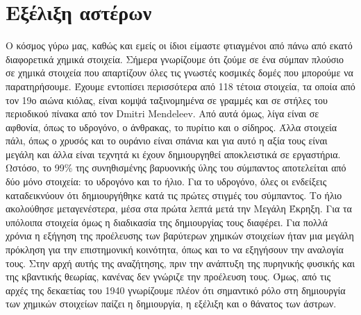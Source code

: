\section{Εξέλιξη αστέρων}
Ο κόσμος γύρω μας, καθώς και εμείς οι ίδιοι είμαστε φτιαγμένοι από πάνω από εκατό διαφορετικά χημικά στοιχεία. Σήμερα γνωρίζουμε ότι ζούμε σε ένα σύμπαν πλούσιο σε χημικά στοιχεία που απαρτίζουν όλες τις γνωστές κοσμικές δομές που μπορούμε να παρατηρήσουμε. Έχουμε εντοπίσει περισσότερα από 118 τέτοια στοιχεία, τα οποία από τον 19ο αιώνα κιόλας, είναι κομψά ταξινομημένα σε γραμμές και σε στήλες του περιοδικού πίνακα από τον Dmitri Mendeleev. Από αυτά όμως, λίγα είναι σε αφθονία, όπως το υδρογόνο, ο άνθρακας, το πυρίτιο και ο σίδηρος. Άλλα στοιχεία πάλι, όπως ο χρυσός και το ουράνιο είναι σπάνια και για αυτό η αξία τους είναι μεγάλη και άλλα είναι τεχνητά κι έχουν δημιουργηθεί αποκλειστικά σε εργαστήρια. Ωστόσο, το 99\% της συνηθισμένης βαρυονικής ύλης του σύμπαντος αποτελείται από δύο μόνο στοιχεία: το υδρογόνο και το ήλιο. Για το υδρογόνο, όλες οι ενδείξεις καταδεικνύουν ότι δημιουργήθηκε κατά τις πρώτες στιγμές του σύμπαντος. Το ήλιο ακολούθησε μεταγενέστερα, μέσα στα πρώτα λεπτά μετά την Μεγάλη Έκρηξη.
Για τα υπόλοιπα στοιχεία όμως η διαδικασία της δημιουργίας τους διαφέρει. Για πολλά χρόνια η εξήγηση της προέλευσης των βαρύτερων χημικών στοιχείων ήταν μια μεγάλη πρόκληση για την επιστημονική κοινότητα, όπως και το να εξηγήσουν την αναλογία τους. Στην αρχή αυτής της αναζήτησης, πριν την ανάπτυξη της πυρηνικής φυσικής και της κβαντικής θεωρίας, κανένας δεν γνώριζε την προέλευση τους. Όμως, από τις αρχές της δεκαετίας του 1940 γνωρίζουμε πλέον ότι σημαντικό ρόλο στη δημιουργία των χημικών στοιχείων παίζει η δημιουργία, η εξέλιξη και ο θάνατος των άστρων.  
